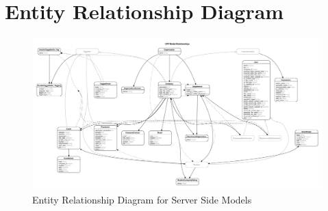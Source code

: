 \section{Entity Relationship Diagram}    
\begin{figure}[H]\centering
\includegraphics[scale=0.3, angle=90]{images/appendix/erd.pdf}
\caption{Entity Relationship Diagram for Server Side Models}
\end{figure}